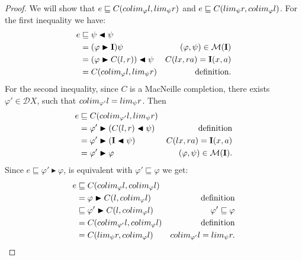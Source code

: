 \documentclass[10pt,a4paper]{amsart}
\newcommand{\cont}{{\bf I}}
\begin{document}
\begin{proof}
    We will show that $e\sqsubseteq C({\rm colim}_{\varphi}l,{\rm lim}_\psi r)$ and $e\sqsubseteq C({\rm lim}_\psi r,{\rm colim}_{\varphi}l)$.
 For the first inequality we have:
    \begin{align*}
        e&\sqsubseteq \psi\blacktriangleleft\psi & \\
        &=(\varphi\blacktriangleright\cont)\psi & (\varphi,\psi)\in\mathcal{M}(\cont)\\
        &=(\varphi\blacktriangleright C(l,r))\blacktriangleleft \psi & C(lx,ra)=\cont(x,a)\\
        &=C({\rm colim}_{\varphi}l,{\rm lim}_\psi r) & \text{definition.}
    \end{align*}
    For the second inequality, since $C$ is a MacNeille completion, there exists $\varphi'\in\mathcal DX$, such that ${\rm colim}_{\varphi'}l= {\rm lim}_\psi r$. Then 
    \begin{align*}
        e &\sqsubseteq C({\rm colim}_{\varphi'}l,{\rm lim}_\psi r) & \\
        & =\varphi'\blacktriangleright (C(l,r)\blacktriangleleft\psi) & \text{definition}\\
        & =\varphi'\blacktriangleright (\cont\blacktriangleleft\psi) &C(lx,ra)=\cont(x,a)\\
        &=\varphi'\blacktriangleright\varphi & (\varphi,\psi)\in\mathcal{M}(\cont).
    \end{align*}
    Since $e\sqsubseteq \varphi'\blacktriangleright\varphi$, is equivalent with $\varphi'\sqsubseteq\varphi$ we get:
    \begin{align*}
        e&\sqsubseteq C({\rm colim}_{\varphi}l,{\rm colim}_{\varphi}l) &\\
        &=\varphi\blacktriangleright C(l,{\rm colim}_{\varphi}l) & \text{definition}\\
        &\sqsubseteq\varphi'\blacktriangleright C(l,{\rm colim}_{\varphi}l) & \varphi'\sqsubseteq\varphi\\
        &=C({\rm colim}_{\varphi'}l,{\rm colim}_{\varphi}l) &\text{definition}\\
        &=C({\rm lim}_\psi r,{\rm colim}_{\varphi}l) & {\rm colim}_{\varphi'}l= {\rm lim}_\psi r.
    \end{align*}
\end{proof}
\end{document}
